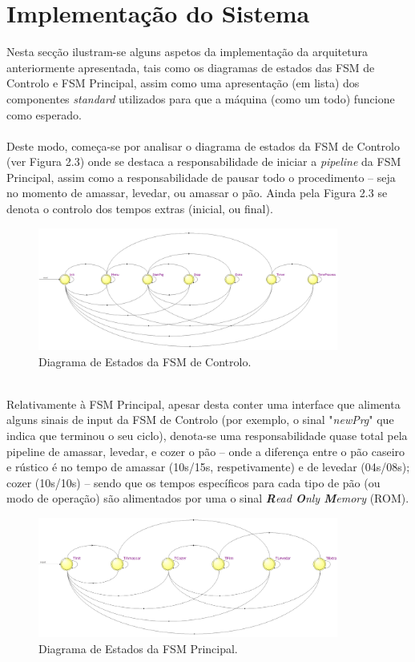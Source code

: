 \documentclass{report}
\begin{document}
\section{Implementação do Sistema}
Nesta secção ilustram-se alguns aspetos da implementação da arquitetura anteriormente apresentada, tais como os diagramas de estados das FSM de Controlo e FSM Principal, assim como uma apresentação (em lista) dos componentes \textit{standard} utilizados para que a máquina (como um todo) funcione como esperado.
\\\\
Deste modo, começa-se por analisar o diagrama de estados da FSM de Controlo (ver Figura 2.3) onde se destaca a responsabilidade de iniciar a \textit{pipeline} da FSM Principal, assim como a responsabilidade de pausar todo o procedimento -- seja no momento de amassar, levedar, ou amassar o pão. Ainda pela Figura 2.3 se denota o controlo dos tempos extras (inicial, ou final).
\begin{figure}[h!] %
	\center
	\includegraphics[width=280pt]{images/FSM1_2}
	\caption{Diagrama de Estados da FSM de Controlo.}
	\label{fig:imagem3}
\end{figure}
\\
Relativamente à FSM Principal, apesar desta conter uma interface que alimenta alguns sinais de input da FSM de Controlo (por exemplo, o sinal "\textit{newPrg}" que indica que terminou o seu ciclo), denota-se uma responsabilidade quase total pela pipeline de amassar, levedar, e cozer o pão -- onde a diferença entre o pão caseiro e rústico é no tempo de amassar (10s/15s, respetivamente) e de levedar (04s/08s); cozer (10s/10s) -- sendo que os tempos específicos para cada tipo de pão (ou modo de operação) são alimentados por uma o sinal \textit{\textbf{R}ead \textbf{O}nly \textbf{M}emory} (ROM).
\begin{figure}[h!] %
	\center
	\includegraphics[width=280pt]{images/FSM2_2}
	\caption{Diagrama de Estados da FSM Principal.}
	\label{fig:imagem4}
\end{figure}
\end{document}
